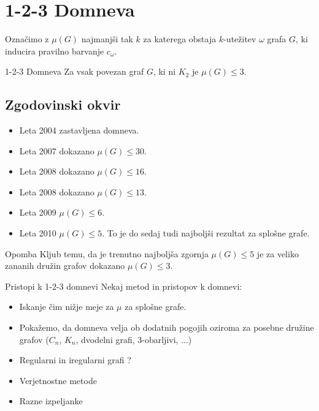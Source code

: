 \documentclass{beamer}
\begin{document}
\section{1-2-3 Domneva}
\begin{frame}
\begin{block}{}
	Označimo z $\mu(G)$ najmanjši tak $k$ za katerega obstaja $k$-utežitev $\omega$ grafa $G$, ki inducira pravilno barvanje $c_{\omega}$.
\end{block}
\begin{block}{1-2-3 Domneva}
	Za vsak povezan graf $G$, ki ni $K_2$ je $\mu(G) \le 3$.
\end{block}
\end{frame}

\subsection{Zgodovinski okvir}
\begin{frame}
\begin{itemize}
	\item Leta 2004 zastavljena domneva.
	\item Leta 2007 dokazano $\mu(G) \le 30$.
	\item Leta 2008 dokazano $\mu(G) \le 16$.
	\item Leta 2008 dokazano $\mu(G) \le 13$.
	\item Leta 2009 $\mu(G) \le 6$.
	\item Leta 2010 $\mu(G) \le 5$. To je do sedaj tudi najboljši rezultat za splošne grafe.
\end{itemize}

\begin{block}{Opomba}
	Kljub temu, da je trenutno najboljša zgornja $\mu(G) \le 5$ je za veliko zananih družin grafov dokazano $\mu(G) \le 3$. 
\end{block}
\end{frame}

\begin{frame}{Pristopi k 1-2-3 domnevi}
	Nekaj metod in pristopov k domnevi:\pause
	\begin{itemize}
		\item Iskanje čim nižje meje za $\mu$ za splošne grafe. \pause
		\item Pokažemo, da domneva velja ob dodatnih pogojih oziroma za posebne družine grafov ($C_n$, $K_n$, dvodelni grafi, $3$-obarljivi, ...) \pause
		\item Regularni in iregularni grafi ? \pause
		\item Verjetnostne metode \pause
		\item Razne izpeljanke
		
	\end{itemize}	
	
	

\end{frame}
\end{document}
